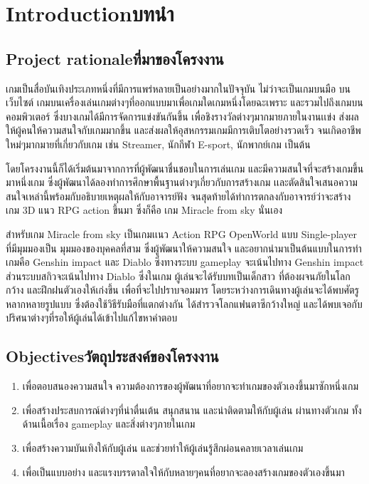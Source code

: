 \chapter{\ifenglish Introduction\else บทนำ\fi}

\section{\ifenglish Project rationale\else ที่มาของโครงงาน\fi}
\enskip \enskip \enskip \enskip \enskip 
เกมเป็นสื่อบันเทิงประเภทหนึ่งที่มีการแพร่หลายเป็นอย่างมากในปัจจุบัน ไม่ว่าจะเป็นเกมบนมือ บนเว็บไซต์ เกมบนเครื่องเล่นเกมต่างๆที่ออกแบบมาเพื่อเกมใดเกมหนึ่งโดยฉะเพราะ และรวมไปถึงเกมบนคอมพิวเตอร์ ซึ่งบางเกมได้มีการจัดการแข่งขันกันขึ้น เพื่อชิงรางวัลต่างๆมากมายภายในงานเเข่ง ส่งผลให้ผู้คนให้ความสนใจกับเกมมากขึ้น และส่งผลให้อุสหกรรมเกมมีการเติบโตอย่างรวดเร็ว จนเกิดอาชีพใหม่ๆมากมายที่เกี่ยวกับเกม เช่น Streamer, นักกีฬา E-sport, นักพากย์เกม เป็นต้น   

\enskip \enskip
โดยโครงงานนี้ก็ได้เริ่มต้นมาจากการที่ผู้พัฒนาชื่นชอบในการเล่นเกม และมีความสนใจที่จะสร้างเกมขึ้นมาหนึ่งเกม ซึ่งผู้พัฒนาได้ลองทำการศึกษาพื้นฐานต่างๆเกี่ยวกับการสร้างเกม เเละตัดสินใจเสนอความสนใจเหล่านี้พร้อมกับอธิบายเหตุผลให้กับอาจารย์ฟัง จนสุดท้ายได้ทำการตกลงกับอาจารย์ว่าจะสร้างเกม 3D แนว RPG action ขึ้นมา ซึ่งก็คือ เกม Miracle from sky นั่นเอง 

\enskip \enskip สำหรับเกม Miracle from sky เป็นเกมเเนว Action RPG OpenWorld แบบ Single-player ที่มีมุมมองเป็น มุมมองของบุคคลที่สาม ซึ่งผู้พัฒนาให้ความสนใจ และอยากนำมาเป็นต้นแบบในการทำเกมคือ Genshin impact และ Diablo ซึ่งทางระบบ gameplay จะเน้นไปทาง Genshin impact ส่วนระบบสกิวจะเน้นไปทาง Diablo ซึ่งในเกม ผู้เล่นจะได้รับบทเป็นเด็กสาว ที่ต้องผจนภัยในโลกกว้าง และฝึกฝนตัวเองให้เก่งขึ้น เพื่อที่จะไปปราบจอมมาร โดยระหว่างการเดินทางผู้เล่นจะได้พบศัตรูหลากหลายรูปแบบ ซึ่งต้องใช้วิธีรับมือที่แตกต่างกัน ได้สำรวจโลกแฟนตาซีกว้างใหญ่ และได้พบเจอกับปริศนาต่างๆที่รอให้ผู้เล่นได้เข้าไปแก้ไขหาคำตอบ 
\section{\ifenglish Objectives\else วัตถุประสงค์ของโครงงาน\fi}
\begin{enumerate}
    \item เพื่อตอบสนองความสนใจ ความต้องการของผู้พัฒนาที่อยากจะทำเกมของตัวเองขึ้นมาซักหนึ่งเกม
    \item เพื่อสร้างประสบการณ์ต่างๆที่น่าตื่นเต้น สนุกสนาน และน่าติดตามให้กับผู้เล่น ผ่านทางตัวเกม ทั้งด้านเนื้อเรื่อง gameplay และสิ่งต่างๆภายในเกม
    \item เพื่อสร้างความบันเทิงให้กับผู้เล่น และช่วยทำให้ผู้เล่นรู้สึกผ่อนคลายเวลาเล่นเกม
    \item เพื่อเป็นแบบอย่าง และแรงบรรดาลใจให้กับหลายๆคนที่อยากจะลองสร้างเกมของตัวเองขึ้นมา
\end{enumerate}

